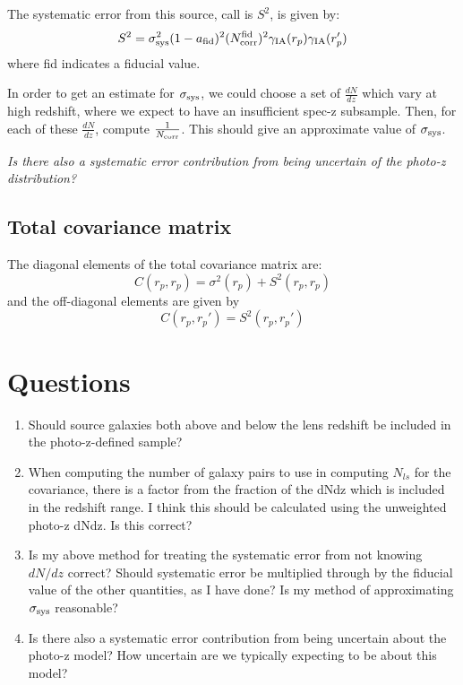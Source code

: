 \documentclass[onecolumn,amsmath,aps,fleqn, superscriptaddress]{revtex4}
\begin{document}
The systematic error from this source, call is $S^2$, is given by:
\begin{equation}
S^2 = \sigma_{\rm sys}^2 (1-a_{\rm fid})^2(N_{\rm corr}^{{\rm fid}})^2 \gamma_{\rm IA}(r_p) \gamma_{\rm IA}(r_p')
\label{S^2}
\end{equation}
where fid indicates a fiducial value.

In order to get an estimate for $\sigma_{\rm sys}$, we could choose a set of $\frac{dN}{dz}$ which vary at high redshift, where we expect to have an insufficient spec-z subsample. Then, for each of these $\frac{dN}{dz}$, compute $\frac{1}{N_{\rm corr}}$. This should give an approximate value of $\sigma_{\rm sys}$.

{\it Is there also a systematic error contribution from being uncertain of the photo-z distribution?}

\subsection*{Total covariance matrix}

The diagonal elements of the total covariance matrix are:
\begin{equation}
C(r_p,r_p) = \sigma^2(r_p) + S^2(r_p, r_p)
\label{diag}
\end{equation}
and the off-diagonal elements are given by
\begin{equation}
C(r_p, r_p') = S^2(r_p,r_p')
\label{off_diag}
\end{equation}

\section*{Questions}
\begin{enumerate}
\item{Should source galaxies both above and below the lens redshift be included in the photo-z-defined sample?}
\item{When computing the number of galaxy pairs to use in computing $N_{ls}$ for the covariance, there is a factor from the fraction of the dNdz which is included in the redshift range. I think this should be calculated using the unweighted photo-z dNdz. Is this correct?}
\item{Is my above method for treating the systematic error from not knowing $dN/dz$ correct? Should systematic error be multiplied through by the fiducial value of the other quantities, as I have done? Is my method of approximating $\sigma_{\rm sys}$ reasonable?}
\item{Is there also a systematic error contribution from being uncertain about the photo-z model? How uncertain are we typically expecting to be about this model?}
\end{enumerate}


\end{document}
